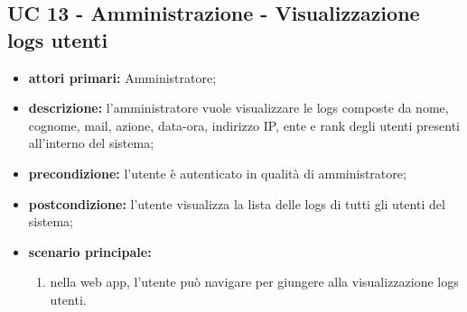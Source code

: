 		\subsection{UC 13 - Amministrazione - Visualizzazione logs utenti}
		\begin{itemize}
			\item \textbf{attori primari:} Amministratore;
			\item \textbf{descrizione:} l'amministratore vuole visualizzare le logs composte da nome, cognome, mail, azione, data-ora, indirizzo IP, ente e rank degli utenti presenti all'interno del sistema;
			\item \textbf{precondizione:} l'utente è autenticato in qualità di amministratore;
			\item \textbf{postcondizione:} l'utente visualizza la lista delle logs di tutti gli utenti del sistema;
			\item \textbf{scenario principale:}
			\begin{enumerate}
				\item nella web app, l'utente può navigare per giungere alla visualizzazione logs utenti.
			\end{enumerate}	
		\end{itemize}

